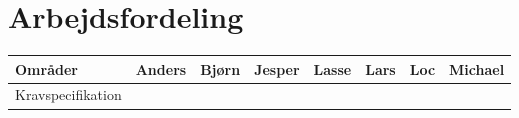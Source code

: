 \chapter*{Arbejdsfordeling}

\begin{tabular}{|l|c|c|c|c|c|c|c|}
\hline 
\textbf{Områder} 			& Anders 		& Bjørn 	& Jesper 		& Lasse 	& Lars 		& Loc 		& Michael \\ 
\hline

Kravspecifikation 		&\checkmark 	&\checkmark	&\checkmark	&\checkmark	&\checkmark 	&\checkmark	&\checkmark \\ 
\hline 
\end{tabular} 

%
